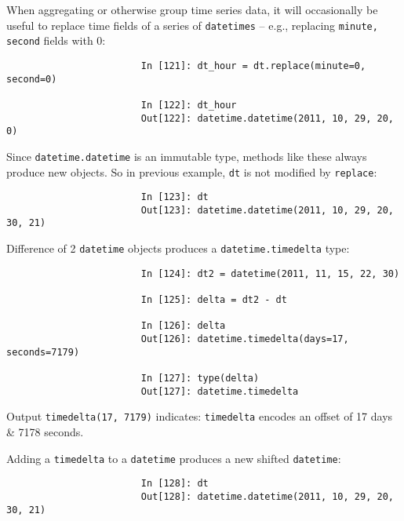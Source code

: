\documentclass{article}
\begin{document}
\begin{enumerate}
\begin{itemize}
\begin{itemize}
\begin{itemize}
\begin{itemize}
					When aggregating or otherwise group time series data, it will occasionally be useful to replace time fields of a series of {\tt datetimes} -- e.g., replacing {\tt minute, second} fields with 0:
					\begin{verbatim}
						In [121]: dt_hour = dt.replace(minute=0, second=0)
						
						In [122]: dt_hour
						Out[122]: datetime.datetime(2011, 10, 29, 20, 0)
					\end{verbatim}
					Since {\tt datetime.datetime} is an immutable type, methods like these always produce new objects. So in previous example, {\tt dt} is not modified by {\tt replace}:
					\begin{verbatim}
						In [123]: dt
						Out[123]: datetime.datetime(2011, 10, 29, 20, 30, 21)
					\end{verbatim}
					Difference of 2 {\tt datetime} objects produces a {\tt datetime.timedelta} type:
					\begin{verbatim}
						In [124]: dt2 = datetime(2011, 11, 15, 22, 30)
						
						In [125]: delta = dt2 - dt
						
						In [126]: delta
						Out[126]: datetime.timedelta(days=17, seconds=7179)
						
						In [127]: type(delta)
						Out[127]: datetime.timedelta
					\end{verbatim}
					Output {\tt timedelta(17, 7179)} indicates: {\tt timedelta} encodes an offset of 17 days \& 7178 seconds.
					
					Adding a {\tt timedelta} to a {\tt datetime} produces a new shifted {\tt datetime}:
					\begin{verbatim}
						In [128]: dt
						Out[128]: datetime.datetime(2011, 10, 29, 20, 30, 21)
						

\end{verbatim}
\end{itemize}
\end{itemize}
\end{itemize}
\end{itemize}
\end{enumerate}
\end{document}
